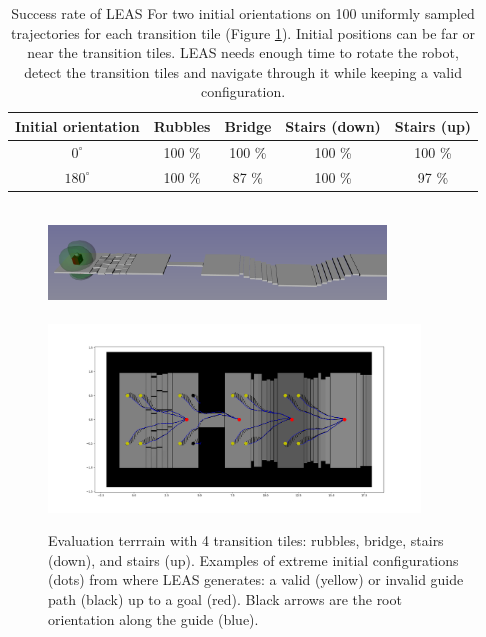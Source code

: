 \begin{table}[h]
\centering
\begin{tabular}{ |c|c|c|c|c| } 
    \hline
    Initial orientation & Rubbles & Bridge & Stairs (down) & Stairs (up) \\ 
    \hline
    $0^{\circ}$ & 100 \% & 100 \% & 100 \% & 100 \%  \\ 
    \hline
    $180^{\circ}$ & 100 \% & 87 \% & 100 \% & 97 \% \\
    \hline
\end{tabular}
\caption{Success rate of LEAS For two initial orientations on 100 uniformly sampled trajectories for each transition tile (Figure \ref{fig:tests_1x11}). Initial positions can be far or near the transition tiles. LEAS needs enough time to rotate the robot, detect the transition tiles and navigate through it while keeping a valid configuration.}
\label{tab:tests_1x11}
\end{table}


\begin{figure}[h]
    \centering
    \includegraphics[width=0.8\textwidth,trim={0cm 0cm 0cm 0cm},clip, height=3cm]{Figures/Chapter_LEAS/1x11_tests.png}
    \includegraphics[width=\textwidth,trim={5cm 2cm 4cm 2cm},clip, height=5cm]{Figures/Chapter_LEAS/1x11_example_180deg.png}
    \caption{Evaluation terrrain with 4 transition tiles: rubbles, bridge, stairs (down), and stairs (up). Examples of extreme initial configurations (dots) from where LEAS generates: a valid (yellow) or invalid guide path (black) up to a goal (red). Black arrows are the root orientation along the guide (blue).}
    \label{fig:tests_1x11}
\end{figure}

